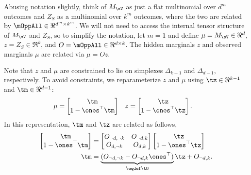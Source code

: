 Abusing notation slightly, think of $M_\sV$ as just a flat multinomial over $d^m$ outcomes
and $Z_S$ as a multinomial over $k^m$ outcomes, where the two are related by
$\mOppAll \in \Re^{d^m \times k^m}$.
We will not need to access the internal tensor structure of $M_\sV$ and $Z_S$,
so to simplify the notation, let $m=1$
and define $\mu = M_\sV \in \Re^d$,
$z = Z_S \in \Re^k$,
and $O = \mOppAll \in \Re^{d \times k}$.
The hidden marginals $z$ and observed marginals $\mu$ are related via $\mu = O z$.

Note that $z$ and $\mu$ are constrained to lie on simplexes $\Delta_{k-1}$ and $\Delta_{d-1}$, respectively. 
To avoid constraints, we reparameterize $z$ and $\mu$ using
$\tz \in \Re^{k-1}$ and $\tm \in \Re^{d-1}$:
\begin{align*}
  \mu &= 
    \begin{bmatrix}
      \tm \\
      1 - \ones^\top\tm
    \end{bmatrix} 
  &
  z &= 
    \begin{bmatrix}
      \tz \\
      1 - \ones^\top\tz
    \end{bmatrix}.
\end{align*}
In this representation, $\tm$ and $\tz$ are related as follows,
\begin{align*}
  \begin{bmatrix}
    \tm \\
    1 - \ones^\top\tm
  \end{bmatrix} 
  &=
    \begin{bmatrix}
      O_{\neg d,\neg k} & O_{\neg d, k} \\ 
      O_{d,\neg k} & O_{d, k} \\ 
    \end{bmatrix}
    \begin{bmatrix}
      \tz \\
      1 - \ones^\top\tz
    \end{bmatrix} \\
  \tm 
      &= \underbrace{(O_{\neg d,\neg k} - O_{\neg d, k} \ones^\top )}_{\eqdef \tO} \tz +  O_{\neg d,k}.
\end{align*}

